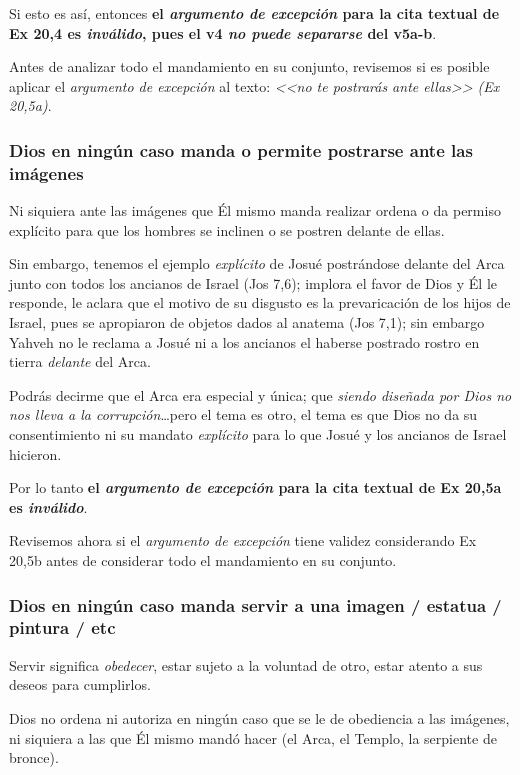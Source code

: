 \documentclass{article}
\begin{document}
Si esto es as\'{i}, entonces \textbf{el \emph{argumento de excepci\'on} para la cita textual de Ex 20,4 es \emph{inv\'alido}, pues el v4 \emph{no puede separarse} del v5a-b}.

Antes de analizar todo el mandamiento en su conjunto, revisemos si es posible aplicar el \emph{argumento de excepci\'on} al texto: \emph{<<no te postrar\'as ante ellas>> (Ex 20,5a)}.

\subsubsection{Dios en ning\'un caso manda o permite postrarse ante las im\'agenes}

Ni siquiera ante las im\'agenes que \'El mismo manda realizar ordena o da permiso expl\'{i}cito para que los hombres se inclinen o se postren delante de ellas.

Sin embargo, tenemos el ejemplo \emph{expl\'{i}cito} de Josu\'e postr\'andose delante del Arca junto con todos los ancianos de Israel (Jos 7,6); implora el favor de Dios y \'El le responde, le aclara que el motivo de su disgusto es la prevaricaci\'on de los hijos de Israel, pues se apropiaron de objetos dados al anatema (Jos 7,1); sin embargo Yahveh no le reclama a Josu\'e ni a los ancianos el haberse postrado rostro en tierra \emph{delante} del Arca.

Podr\'as decirme que el Arca era especial y \'unica; que \emph{siendo dise\~nada por Dios no nos lleva a la corrupci\'on}\ldots pero el tema es otro, el tema es que Dios no da su consentimiento ni su mandato \emph{expl\'{i}cito} para lo que Josu\'e y los ancianos de Israel hicieron.

Por lo tanto \textbf{el \emph{argumento de excepci\'on} para la cita textual de Ex 20,5a es \emph{inv\'alido}}.

Revisemos ahora si el \emph{argumento de excepci\'on} tiene validez considerando Ex 20,5b antes de considerar todo el mandamiento en su conjunto.

\subsubsection{Dios en ning\'un caso manda servir a una imagen / estatua / pintura / etc}

Servir significa \emph{obedecer}, estar sujeto a la voluntad de otro, estar atento a sus deseos para cumplirlos.

Dios no ordena ni autoriza en ning\'un caso que se le de obediencia a las im\'agenes, ni siquiera a las que \'El mismo mand\'o hacer (el Arca, el Templo, la serpiente de bronce).
\end{document}
